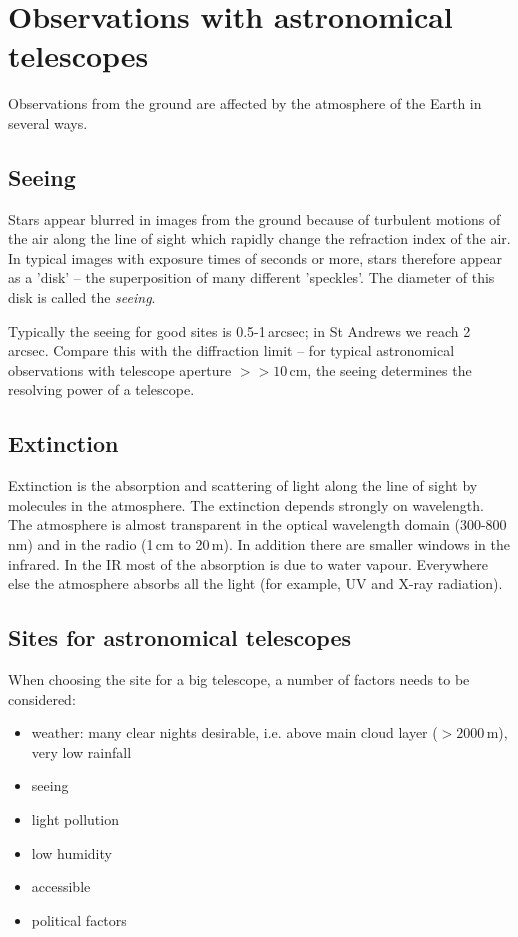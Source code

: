 \section{Observations with astronomical telescopes}

Observations from the ground are affected by the atmosphere of the Earth in several ways.

\subsection{Seeing}

Stars appear blurred in images from the ground because of turbulent motions of the air along the line of sight which rapidly change the refraction index of the air. In typical images with exposure times of seconds or more, stars therefore appear as a 'disk' -- the superposition of many different 'speckles'. The diameter of this disk is called the \textit{seeing}. 

Typically the seeing for good sites is 0.5-1\,arcsec; in St Andrews we reach 2\,arcsec. Compare this with the diffraction limit -- for typical astronomical observations with telescope aperture $>>10$\,cm, the seeing determines the resolving power of a telescope.

\subsection{Extinction}

Extinction is the absorption and scattering of light along the line of sight by molecules in the atmosphere. The extinction depends strongly on wavelength. The atmosphere is almost transparent in the optical wavelength domain (300-800\,nm) and in the radio (1\,cm to 20\,m). In addition there are smaller windows in the infrared. In the IR most of the absorption is due to water vapour. Everywhere else the atmosphere absorbs all the light (for example, UV and X-ray radiation).  

\subsection{Sites for astronomical telescopes}

When choosing the site for a big telescope, a number of factors needs to be considered:

\begin{itemize}
\item{weather: many clear nights desirable, i.e. above main cloud layer ($>2000$\,m), very low rainfall}
\item{seeing}
\item{light pollution}
\item{low humidity}
\item{accessible}
\item{political factors}
\end{itemize}

